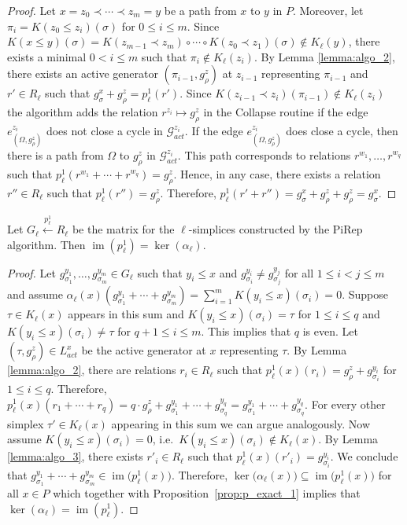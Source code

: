 \documentclass[english,a4paper,nolineno,cleveref]{socg-lipics-v2021}
\DeclareMathOperator{\im}{im}
\begin{document}
\begin{proof}
Let $x=z_0\prec\cdots\prec z_m=y$ be a path from $x$ to $y$ in $P$. Moreover, let $\pi_i=K(z_0\leq z_i)(\sigma)$ for $0\leq i\leq m$. Since $K(x\leq y)(\sigma)=K(z_{m\minus 1}\prec z_m)\circ\cdots\circ K(z_0\prec z_1)(\sigma)\notin K_\ell(y)$, there exists a minimal $0<i\leq m$ such that $\pi_i\notin K_\ell(z_i)$. By Lemma \ref{lemma:algo_2}, there exists an active generator $(\pi_{i\minus 1},g^z_\rho)$ at $z_{i\minus 1}$ representing $\pi_{i \minus 1}$ and $r'\in R_\ell$ such that $g^x_\sigma+g^z_\rho=p_\ell^1(r')$. Since $K(z_{i\minus 1}\prec z_i)(\pi_{i\minus 1})\notin K_\ell(z_i)$ the algorithm adds the relation $r^{z_i}\mapsto g^z_\rho$ in the {\sc Collapse} routine if the edge $e_{(\Omega,g^z_\rho)}^{z_i}$ does not close a cycle in $\mathcal{G}_{act}^{z_i}$. If the edge $e_{(\Omega,g^z_\rho)}^{z_i}$ does close a cycle, then there is a path from $\Omega$ to $g^z_\rho$ in $\mathcal{G}_{act}^{z_i}$. This path corresponds to relations $r^{w_1},\ldots,r^{w_q}$ such that $p_\ell^1(r^{w_1}+\cdots+r^{w_q})=g^z_\rho$. Hence, in any case, there exists a relation $r''\in R_\ell$ such that $p_\ell^1(r'')=g^z_\rho$. Therefore, $p_\ell^1(r'+r'')=g^x_\sigma+g^z_\rho+g^z_\rho=g^x_\sigma$. 
\end{proof}


\begin{proposition} \label{prop:p_exact_2}
Let $G_\ell\xleftarrow{p_\ell^1}R_\ell$ be the matrix for the $\ell$-simplices constructed by the {\sc PiRep} algorithm. Then $\im(p_\ell^1)=\ker(\alpha_\ell)$. 
\end{proposition}

\begin{proof}
Let $g^{y_1}_{\sigma_1},\ldots,g^{y_m}_{\sigma_m}\in G_\ell$ such that $y_i\leq x$ and $g^{y_i}_{\sigma_i}\neq g^{y_j}_{\sigma_j}$ for all $1\leq i<j \leq m$ and assume $\alpha_\ell(x)(g^{y_1}_{\sigma_1}+\cdots+g^{y_m}_{\sigma_m})=\sum_{i=1}^m K(y_i\leq x)(\sigma_i)=0$. Suppose $\tau\in K_\ell(x)$ appears in this sum and $K(y_i\leq x)(\sigma_i)=\tau$ for $1\leq i\leq q$ and $K(y_i\leq x)(\sigma_i)\neq\tau$ for $q+1\leq i\leq m$. This implies that $q$ is even. Let $(\tau,g^z_\rho)\in L_{act}^x$ be the active generator at $x$ representing $\tau$. By Lemma \ref{lemma:algo_2}, there are relations $r_i\in R_\ell$ such that $p_\ell^1(x)(r_i)=g^z_\rho+g^{y_i}_{\sigma_i}$ for $1\leq i\leq q$. Therefore, $p_\ell^1(x)(r_1+\cdots+r_q)=q\cdot g^z_\rho+g^{y_1}_{\sigma_1}+\cdots+g^{y_q}_{\sigma_q}=g^{y_1}_{\sigma_1}+\cdots+g^{y_q}_{\sigma_q}$. For every other simplex $\tau'\in K_\ell(x)$ appearing in this sum we can argue analogously. Now assume $K(y_i\leq x)(\sigma_i)=0$, i.e.\ $K(y_i\leq x)(\sigma_i)\notin K_\ell(x)$. By Lemma \ref{lemma:algo_3}, there exists $r'_i\in R_\ell$ such that $p_\ell^1(x)(r'_i)=g^{y_i}_{\sigma_i}$. We conclude that $g^{y_1}_{\sigma_1}+\cdots+g^{y_m}_{\sigma_m}\in\im\!\big( p_\ell^1(x)\big)$. Therefore, $\ker\!\big(\alpha_\ell(x)\big)\subseteq \im\!\big(p_\ell^1(x)\big)$ for all $x\in P$ 
which together with Proposition~\ref{prop:p_exact_1} implies that $\ker(\alpha_\ell)=\im(p_\ell^1)$. 
\end{proof}
\end{document}
